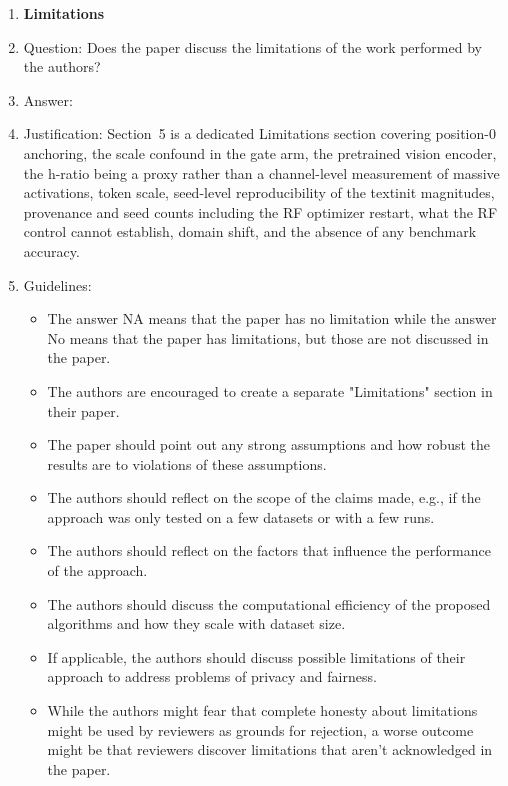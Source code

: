 \begin{enumerate}
\item {\bf Limitations}
    \item[] Question: Does the paper discuss the limitations of the work performed by the authors?
    \item[] Answer: \answerYes{}
    \item[] Justification: Section~5 is a dedicated Limitations section covering position-0 anchoring, the scale confound in the gate arm, the pretrained vision encoder, the h-ratio being a proxy rather than a channel-level measurement of massive activations, token scale, seed-level reproducibility of the textinit magnitudes, provenance and seed counts including the RF optimizer restart, what the RF control cannot establish, domain shift, and the absence of any benchmark accuracy.
    \item[] Guidelines:
    \begin{itemize}
        \item The answer NA means that the paper has no limitation while the answer No means that the paper has limitations, but those are not discussed in the paper.
        \item The authors are encouraged to create a separate "Limitations" section in their paper.
        \item The paper should point out any strong assumptions and how robust the results are to violations of these assumptions.
        \item The authors should reflect on the scope of the claims made, e.g., if the approach was only tested on a few datasets or with a few runs.
        \item The authors should reflect on the factors that influence the performance of the approach.
        \item The authors should discuss the computational efficiency of the proposed algorithms and how they scale with dataset size.
        \item If applicable, the authors should discuss possible limitations of their approach to address problems of privacy and fairness.
        \item While the authors might fear that complete honesty about limitations might be used by reviewers as grounds for rejection, a worse outcome might be that reviewers discover limitations that aren't acknowledged in the paper.
    \end{itemize}


\end{enumerate}
